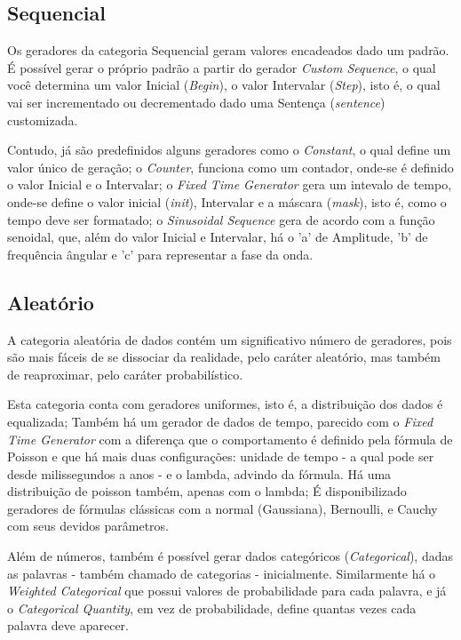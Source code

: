 \documentclass[
	12pt,				%
	openright,			%
	twoside,			%
	a4paper,			%
	english,			%
	brazil				%
	]{abntex2}
\begin{document}
		\subsection{Sequencial}
			Os geradores da categoria Sequencial geram valores encadeados dado um padrão.
			É possível gerar o próprio padrão a partir do gerador \emph{Custom Sequence}, o qual você determina um valor Inicial (\emph{Begin}), o valor Intervalar (\emph{Step}), isto é, o qual vai ser incrementado ou decrementado dado uma Sentença (\emph{sentence}) customizada.
			\par
			Contudo, já são predefinidos alguns geradores como 
				o \emph{Constant}, o qual define um valor único de geração;
				o \emph{Counter}, funciona como um contador, onde-se é definido o valor Inicial e o Intervalar;
				o \emph{Fixed Time Generator} gera um intevalo de tempo, onde-se define o valor inicial (\emph{init}), Intervalar e a máscara (\emph{mask}), isto é, como o tempo deve ser formatado;
				o \emph{Sinusoidal Sequence} gera de acordo com a função senoidal, que, além do valor Inicial e Intervalar, há o 'a' de Amplitude, 'b' de frequência ângular e 'c' para representar a fase da onda.

		\subsection{Aleatório}
			A categoria aleatória de dados contém um significativo número de geradores, pois são mais fáceis de se dissociar da realidade, pelo caráter aleatório, mas também de reaproximar, pelo caráter probabilístico.
			\par
			Esta categoria conta com geradores uniformes, isto é, a distribuição dos dados é equalizada;
				Também há um gerador de dados de tempo, parecido com o \emph{Fixed Time Generator} com a diferença que o comportamento é definido pela fórmula de Poisson e que há mais duas configurações: unidade de tempo - a qual pode ser desde milissegundos a anos - e o lambda, advindo da fórmula.
				Há uma distribuição de poisson também, apenas com o lambda;
				É disponibilizado geradores de fórmulas clássicas com a normal (Gaussiana), Bernoulli, e Cauchy com seus devidos parâmetros.
			\par
			Além de números, também é possível gerar dados categóricos (\emph{Categorical}), dadas as palavras - também chamado de categorias - inicialmente.
				Similarmente há o \emph{Weighted Categorical} que possui valores de probabilidade para cada palavra, e 
				já o \emph{Categorical Quantity}, em vez de probabilidade, define quantas vezes cada palavra deve aparecer.
\end{document}
